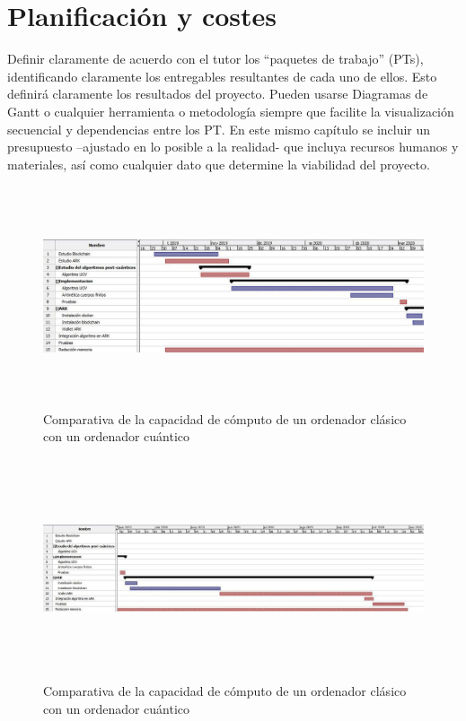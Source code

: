 \chapter{Planificación y costes}

Definir claramente de acuerdo con el tutor los “paquetes de trabajo” (PTs), identificando claramente los entregables resultantes de cada uno de ellos. Esto definirá claramente los resultados del proyecto. Pueden usarse Diagramas de Gantt o cualquier herramienta o metodología siempre que facilite la visualización secuencial y dependencias entre los PT. En este mismo capítulo se incluir un presupuesto –ajustado en lo posible a la realidad- que incluya recursos humanos y materiales, así como cualquier dato que determine la viabilidad del proyecto.




\begin{figure}[h]
	\centering
	\includegraphics[width=16cm,height=6.5cm]{figuras/Gantt_1.jpg}
	\caption{Comparativa de la capacidad de cómputo de un ordenador clásico con un ordenador cuántico\cite{clasica-vs-cuantica}}
	\label{fig:comp-clasica-cuantica}
\end{figure}

\begin{figure}[h]
	\centering
	\includegraphics[width=15cm,height=6.5cm]{figuras/Gantt_2.jpg}
	\caption{Comparativa de la capacidad de cómputo de un ordenador clásico con un ordenador cuántico\cite{clasica-vs-cuantica}}
	\label{fig:comp-clasica-cuantica}
\end{figure}

